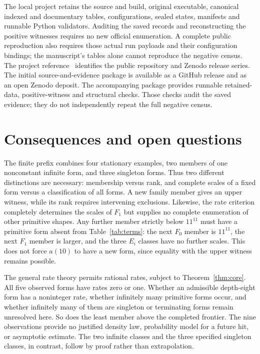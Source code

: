 \documentclass[11pt]{article}
\theoremstyle{definition}
\theoremstyle{remark}
\begin{document}
The local project retains the source and build, original executable,
canonical indexed and documentary tables, configurations, sealed
states, manifests and runnable Python validators. Auditing the
saved records and reconstructing the positive witnesses requires
no new official enumeration. A complete public reproduction also
requires those actual run payloads and their configuration bindings;
the manuscript's tables alone cannot reproduce the negative census.
The project reference~\cite{project} identifies the public repository
and Zenodo release series. The initial source-and-evidence package is
available as a GitHub release and as an open Zenodo deposit.
The accompanying package provides runnable retained-data, positive-witness
and structural checks. Those checks audit the saved evidence; they do
not independently repeat the full negative census.

\section{Consequences and open questions}\label{sec:questions}

The finite prefix combines four stationary examples, two members
of one nonconstant infinite form, and three singleton forms.
Thus two different distinctions are necessary: membership versus
rank, and complete scales of a fixed form versus a classification
of all forms. A new family member gives an upper witness, while
its rank requires intervening exclusions. Likewise, the rate
criterion completely determines the scales of $F_1$ but supplies
no complete enumeration of other primitive shapes. Any further
member strictly below $11^{11}$ must have a primitive form absent
from Table~\ref{tab:terms}: the next $F_0$ member is $11^{11}$,
the next $F_1$ member is larger, and the three $E_i$ classes have
no further scales. This does not force $a(10)$ to have a new form,
since equality with the upper witness remains possible.

The general rate theory permits rational rates, subject to
Theorem~\ref{thm:core}. All five observed forms have rates zero
or one. Whether an admissible depth-eight form has a noninteger
rate, whether infinitely many primitive forms occur, and whether
infinitely many of them are singleton or terminating forms remain
unresolved here. So does the least member above the completed
frontier. The nine observations provide no justified density law,
probability model for a future hit, or asymptotic estimate.
The two infinite classes and the three specified singleton classes,
in contrast, follow by proof rather than extrapolation.
\end{document}
